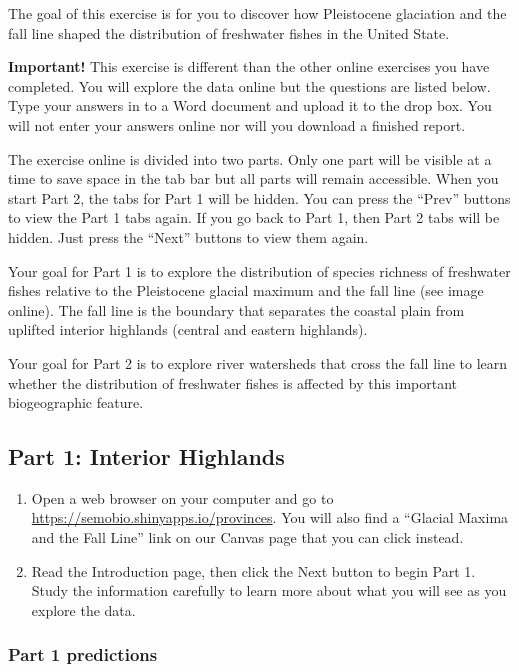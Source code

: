 \documentclass[11pt, addpoints]{exam}
\begin{document}
The goal of this exercise is for you to discover how Pleistocene
glaciation and the fall line shaped the distribution of freshwater
fishes in the United State.

\textbf{Important!} This exercise is different than the other online exercises you have completed. You will explore the data online but
the questions are listed below. Type your answers in to a Word document
and upload it to the drop box. You will not enter your answers online nor will you download a finished report.

The exercise online is divided into two parts. Only one part will be 
visible at a time to save space in the tab bar but all parts will remain 
accessible. When you start Part 2, the tabs for Part 1 will be hidden. 
You can press the “Prev” buttons to view the Part 1 tabs again. If you 
go back to Part 1, then Part 2 tabs will be hidden. Just press the “Next”
buttons to view them again.

Your goal for Part 1 is to explore the distribution of species richness 
of freshwater fishes relative to the Pleistocene glacial 
maximum and the fall line (see image online). The fall line is the
boundary that separates the coastal plain from uplifted interior highlands (central and eastern highlands). 

Your goal for Part 2 is to explore river watersheds that cross the fall 
line to learn whether the distribution of freshwater fishes is affected by this important biogeographic feature.

\subsection*{Part 1: Interior Highlands}

\begin{enumerate}
	\item Open a web browser on your computer and go to \url{https://semobio.shinyapps.io/provinces}. You will also find a “Glacial Maxima and the Fall Line” link on our Canvas page that you can click instead.
	
	\item Read the Introduction page, then click the Next button to begin 
	Part 1. Study the information carefully to learn more about what you
	will see as you explore the data. 
\end{enumerate}

\subsubsection*{Part 1 predictions}
\end{document}
